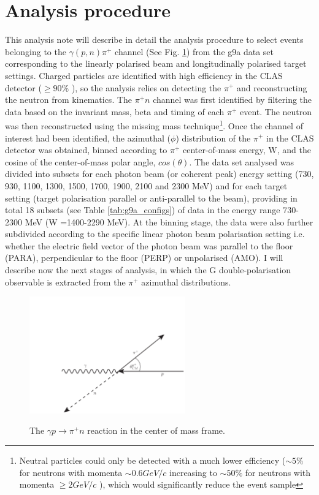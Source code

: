 \section{Analysis procedure}
This analysis note will describe in detail the analysis procedure to select events belonging to the $\gamma (p,n) \pi^+$ channel (See Fig. \ref{fig:frost_diagram}) from the g9a data set corresponding to the linearly polarised beam and longitudinally polarised target settings. Charged particles are identified with high efficiency in the CLAS detector ($\geq90\%$ \cite{Mecking2003}), so the analysis relies on detecting the $\pi^+$ and reconstructing the neutron from kinematics. The $\pi^+ n$ channel was first identified by filtering the data based on the invariant mass, beta and timing of each $\pi^+$ event. The neutron was then reconstructed using the missing mass technique\footnote{Neutral particles could only be detected with a much lower efficiency ($\sim5\%$ for neutrons with momenta $\sim 0.6 GeV/c$ increasing to $\sim 50\%$ for neutrons with momenta $\geq2 GeV/c$  \cite{Mecking2003}), which would significantly reduce the event sample}. Once the channel of interest had been identified, the azimuthal ($\phi$) distribution of the $\pi^+$ in the CLAS detector was obtained, binned according to $\pi^+$ center-of-mass energy, W, and the cosine of the center-of-mass polar angle, $cos(\theta)$. The data set analysed  was divided into subsets for each photon beam (or coherent peak) energy setting (730, 930, 1100, 1300, 1500, 1700, 1900, 2100 and 2300 MeV) and for each target setting (target polarisation parallel or anti-parallel to the beam), providing in total 18 subsets (see Table \ref{tab:g9a_configs}) of data in the energy range 730-2300 MeV (W =1400-2290 MeV). At the binning stage, the data were also further subdivided according to the specific linear photon beam polarisation setting i.e. whether the electric field vector of the photon beam was parallel to the floor (PARA), perpendicular to the floor (PERP) or unpolarised (AMO). I will describe now the next stages of analysis, in which the G double-polarisation observable is extracted from the $\pi^+$ azimuthal distributions.
\begin{figure}[htb]
  \begin{center}
    \includegraphics[width=0.6\textwidth]{figures/frost_reaction.pdf} \\
    \caption{The $\gamma p \rightarrow \pi^+ n $ reaction in the center of mass frame. }
    \label{fig:frost_diagram}
  \end{center}
\end{figure}

